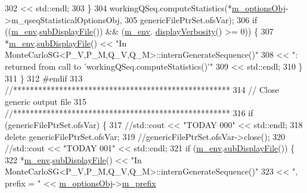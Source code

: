 \begin{DoxyCode}
302                               << std::endl;
303     \}
304     workingQSeq.computeStatistics(*\hyperlink{class_q_u_e_s_o_1_1_monte_carlo_s_g_acf7ce935648fd3a5d0ee23685708b4ca}{m\_optionsObj}->m\_qseqStatisticalOptionsObj,
305                                   genericFilePtrSet.ofsVar);
306     \textcolor{keywordflow}{if} ((\hyperlink{class_q_u_e_s_o_1_1_monte_carlo_s_g_a30055a359b22cde54681679aed8ae6e7}{m\_env}.\hyperlink{class_q_u_e_s_o_1_1_base_environment_a8a0064746ae8dddfece4229b9ad374d6}{subDisplayFile}()) && (\hyperlink{class_q_u_e_s_o_1_1_monte_carlo_s_g_a30055a359b22cde54681679aed8ae6e7}{m\_env}.
      \hyperlink{class_q_u_e_s_o_1_1_base_environment_a1fe5f244fc0316a0ab3e37463f108b96}{displayVerbosity}() >= 0)) \{
307       *\hyperlink{class_q_u_e_s_o_1_1_monte_carlo_s_g_a30055a359b22cde54681679aed8ae6e7}{m\_env}.\hyperlink{class_q_u_e_s_o_1_1_base_environment_a8a0064746ae8dddfece4229b9ad374d6}{subDisplayFile}() << \textcolor{stringliteral}{"In
       MonteCarloSG<P\_V,P\_M,Q\_V,Q\_M>::internGenerateSequence()"}
308                               << \textcolor{stringliteral}{": returned from call to 'workingQSeq.computeStatistics()'"}
309                               << std::endl;
310     \}
311   \}
312 \textcolor{preprocessor}{#endif}
313 \textcolor{preprocessor}{}  \textcolor{comment}{//****************************************************}
314   \textcolor{comment}{// Close generic output file      }
315   \textcolor{comment}{//****************************************************}
316   \textcolor{keywordflow}{if} (genericFilePtrSet.ofsVar) \{
317     \textcolor{comment}{//std::cout << "TODAY 000" << std::endl;}
318     \textcolor{keyword}{delete} genericFilePtrSet.ofsVar;
319     \textcolor{comment}{//genericFilePtrSet.ofsVar->close();}
320     \textcolor{comment}{//std::cout << "TODAY 001" << std::endl;}
321     \textcolor{keywordflow}{if} (\hyperlink{class_q_u_e_s_o_1_1_monte_carlo_s_g_a30055a359b22cde54681679aed8ae6e7}{m\_env}.\hyperlink{class_q_u_e_s_o_1_1_base_environment_a8a0064746ae8dddfece4229b9ad374d6}{subDisplayFile}()) \{
322       *\hyperlink{class_q_u_e_s_o_1_1_monte_carlo_s_g_a30055a359b22cde54681679aed8ae6e7}{m\_env}.\hyperlink{class_q_u_e_s_o_1_1_base_environment_a8a0064746ae8dddfece4229b9ad374d6}{subDisplayFile}() << \textcolor{stringliteral}{"In
       MonteCarloSG<P\_V,P\_M,Q\_V,Q\_M>::internGenerateSequence()"}
323                               << \textcolor{stringliteral}{", prefix = "}                         << 
      \hyperlink{class_q_u_e_s_o_1_1_monte_carlo_s_g_acf7ce935648fd3a5d0ee23685708b4ca}{m\_optionsObj}->\hyperlink{class_q_u_e_s_o_1_1_monte_carlo_s_g_options_ac640fa60af7134d4113e9b7481a34f6c}{m\_prefix}

\end{DoxyCode}
